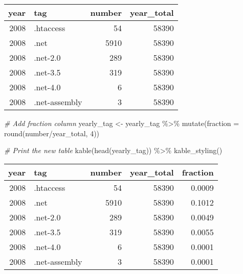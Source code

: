 \documentclass[
]{article}
\newenvironment{Shaded}{\begin{snugshade}}{\end{snugshade}}
\newcommand{\AttributeTok}[1]{\textcolor[rgb]{0.77,0.63,0.00}{#1}}
\newcommand{\CommentTok}[1]{\textcolor[rgb]{0.56,0.35,0.01}{\textit{#1}}}
\newcommand{\DecValTok}[1]{\textcolor[rgb]{0.00,0.00,0.81}{#1}}
\newcommand{\FunctionTok}[1]{\textcolor[rgb]{0.00,0.00,0.00}{#1}}
\newcommand{\NormalTok}[1]{#1}
\newcommand{\OtherTok}[1]{\textcolor[rgb]{0.56,0.35,0.01}{#1}}
\newcommand{\SpecialCharTok}[1]{\textcolor[rgb]{0.00,0.00,0.00}{#1}}
\begin{document}
\begin{table}
\centering
\begin{tabular}{r|l|r|r}
\hline
year & tag & number & year\_total\\
\hline
2008 & .htaccess & 54 & 58390\\
\hline
2008 & .net & 5910 & 58390\\
\hline
2008 & .net-2.0 & 289 & 58390\\
\hline
2008 & .net-3.5 & 319 & 58390\\
\hline
2008 & .net-4.0 & 6 & 58390\\
\hline
2008 & .net-assembly & 3 & 58390\\
\hline
\end{tabular}
\end{table}

\begin{Shaded}
\begin{Highlighting}[]
\CommentTok{\# Add fraction column}
\NormalTok{yearly\_tag }\OtherTok{\textless{}{-}} 
\NormalTok{  yearly\_tag }\SpecialCharTok{\%\textgreater{}\%} 
  \FunctionTok{mutate}\NormalTok{(}\AttributeTok{fraction =} \FunctionTok{round}\NormalTok{(number}\SpecialCharTok{/}\NormalTok{year\_total, }\DecValTok{4}\NormalTok{))}

\CommentTok{\# Print the new table}
\FunctionTok{kable}\NormalTok{(}\FunctionTok{head}\NormalTok{(yearly\_tag)) }\SpecialCharTok{\%\textgreater{}\%} 
  \FunctionTok{kable\_styling}\NormalTok{()}
\end{Highlighting}
\end{Shaded}

\begin{table}
\centering
\begin{tabular}{r|l|r|r|r}
\hline
year & tag & number & year\_total & fraction\\
\hline
2008 & .htaccess & 54 & 58390 & 0.0009\\
\hline
2008 & .net & 5910 & 58390 & 0.1012\\
\hline
2008 & .net-2.0 & 289 & 58390 & 0.0049\\
\hline
2008 & .net-3.5 & 319 & 58390 & 0.0055\\
\hline
2008 & .net-4.0 & 6 & 58390 & 0.0001\\
\hline
2008 & .net-assembly & 3 & 58390 & 0.0001\\
\hline
\end{tabular}
\end{table}
\end{document}
